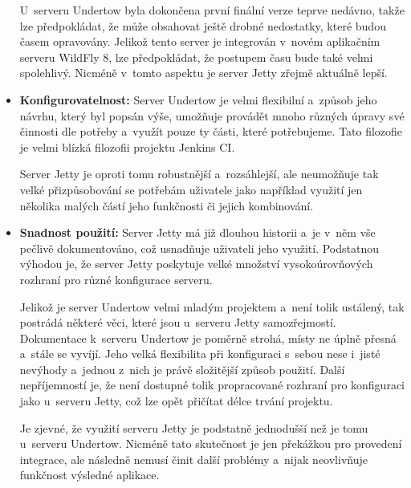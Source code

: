 \begin{itemize}
{                        U~serveru Undertow byla dokončena první finální verze teprve nedávno,
                        takže lze předpokládat, že může obsahovat ještě drobné nedostatky,
                        které budou časem opravovány. Jelikož tento server je integrován
                        v~novém aplikačním serveru WildFly 8, lze předpokládat,
                        že postupem času bude také velmi spolehlivý. 
                        Nicméně v~tomto aspektu je server Jetty zřejmě 
                        aktuálně lepší.}

                \item{\textbf{Konfigurovatelnost:} Server Undertow je velmi flexibilní a~způsob
                    jeho návrhu, který byl popsán výše, umožňuje provádět mnoho různých úpravy 
                    své činnosti dle potřeby a~využít pouze ty části, které potřebujeme.
                    Tato filozofie je velmi blízká filozofii projektu Jenkins CI. 
                    
                    Server Jetty
                    je oproti tomu robustnější a~rozsáhlejší, ale neumožňuje tak velké přizpůsobování se potřebám
                    uživatele jako například využití jen několika malých částí jeho funkčnosti či jejich
                    kombinování. }


                \item{\textbf{Snadnost použití:}}                      
                    Server Jetty má již dlouhou historii a~je v~něm vše pečlivě dokumentováno,
                    což usnadňuje uživateli jeho využití. Podstatnou výhodou je, že
                    server Jetty poskytuje velké množství vysokoúrovňových rozhraní
                    pro různé konfigurace serveru.
                    
                    Jelikož je server Undertow velmi mladým projektem a~není tolik ustálený, 
                    tak postrádá některé věci,
                    které jsou u~serveru Jetty samozřejmostí. 
                    Dokumentace k~serveru
                    Undertow je poměrně strohá, místy ne úplně přesná a~stále se vyvíjí. 
                    Jeho velká flexibilita při konfiguraci s~sebou nese i~jisté nevýhody
                    a~jednou z~nich je právě složitější způsob použití. Další nepříjemností je, že není
                    dostupné tolik propracované rozhraní pro konfiguraci jako u~serveru Jetty,
                    což lze opět přičítat délce trvání projektu.

                    Je zjevné, že využití serveru Jetty je podstatně jednodušší než je tomu
                    u~serveru Undertow. Nicméně tato skutečnost je jen překážkou pro provedení
                    integrace, ale následně nemusí činit další problémy a~nijak neovlivňuje
                    funkčnost výsledné aplikace.

            \end{itemize}
        

